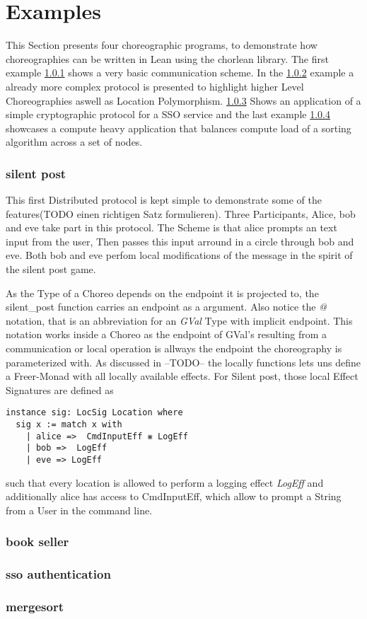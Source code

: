 \chapter{Examples}

This Section presents four choreographic programs, to demonstrate how choreographies can be written in Lean using the chorlean library. The first example \ref{ss:silent} shows a very basic communication scheme. In the \ref{ss:book} example a already more complex protocol is presented to highlight higher Level Choreographies aswell as Location Polymorphism. \ref{ss:sso} Shows an application of a simple cryptographic protocol for a SSO service and the last example \ref{ss:merge} showcases a compute heavy application that balances compute load of a sorting algorithm across a set of  nodes.

\subsection{silent post}
\label{ss:silent}
This first Distributed protocol is kept simple to demonstrate some of the features(TODO einen richtigen Satz formulieren).
Three Participants, Alice, bob and eve take part in this protocol. The Scheme is that alice prompts an text input from the user, Then passes this input arround in a circle through bob and eve. Both bob and eve perfom local modifications of the message in the spirit of the silent post game.

As the Type of a Choreo depends on the endpoint it is projected to, the silent_post function carries an endpoint as a argument. Also notice the \emph{@} notation, that is an abbreviation for an \emph{GVal} Type with implicit endpoint. This notation works inside a Choreo as the endpoint of GVal's resulting from a communication or local operation is allways the endpoint the choreography is parameterized with.
As discussed in --TODO-- the locally functions lets uns define a Freer-Monad with all locally available effects. For Silent post, those local Effect Signatures are defined as
\begin{lstlisting}[language=lean]
instance sig: LocSig Location where
  sig x := match x with
    | alice =>  CmdInputEff ⨳ LogEff
    | bob =>  LogEff
    | eve => LogEff
\end{lstlisting}
such that every location is allowed to perform a logging effect \emph{LogEff} and additionally alice has access to CmdInputEff, which allow to prompt a String from a User in the command line.


\subsection{book seller}
\label{ss:book}


\subsection{sso authentication}
\label{ss:sso}

\subsection{mergesort}
\label{ss:merge}


